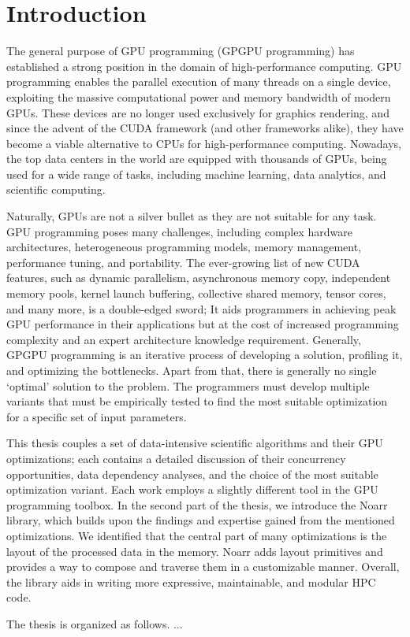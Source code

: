 \chapter{Introduction}

The general purpose of GPU programming (GPGPU programming) has established a strong position in the domain of high-performance computing. 
GPU programming enables the parallel execution of many threads on a single device, exploiting the massive computational power and memory bandwidth of modern GPUs. 
These devices are no longer used exclusively for graphics rendering, and since the advent of the CUDA framework (and other frameworks alike), they have become a viable alternative to CPUs for high-performance computing.
Nowadays, the top data centers in the world are equipped with thousands of GPUs, being used for a wide range of tasks, including machine learning, data analytics, and scientific computing.

Naturally, GPUs are not a silver bullet as they are not suitable for any task. 
GPU programming poses many challenges, including complex hardware architectures, heterogeneous programming models, memory management, performance tuning, and portability.
The ever-growing list of new CUDA features, such as dynamic parallelism, asynchronous memory copy, independent memory pools, kernel launch buffering, collective shared memory, tensor cores, and many more, is a double-edged sword; 
It aids programmers in achieving peak GPU performance in their applications but at the cost of increased programming complexity and an expert architecture knowledge requirement.
Generally, GPGPU programming is an iterative process of developing a solution, profiling it, and optimizing the bottlenecks.
Apart from that, there is generally no single `optimal' solution to the problem. The programmers must develop multiple variants that must be empirically tested to find the most suitable optimization for a specific set of input parameters.

This thesis couples a set of data-intensive scientific algorithms and their GPU optimizations; each contains a detailed discussion of their concurrency opportunities, data dependency analyses, and the choice of the most suitable optimization variant. Each work employs a slightly different tool in the GPU programming toolbox. 
In the second part of the thesis, we introduce the Noarr library, which builds upon the findings and expertise gained from the mentioned optimizations. We identified that the central part of many optimizations is the layout of the processed data in the memory. 
Noarr adds layout primitives and provides a way to compose and traverse them in a customizable manner. Overall, the library aids in writing more expressive, maintainable, and modular HPC code.

The thesis is organized as follows. ...